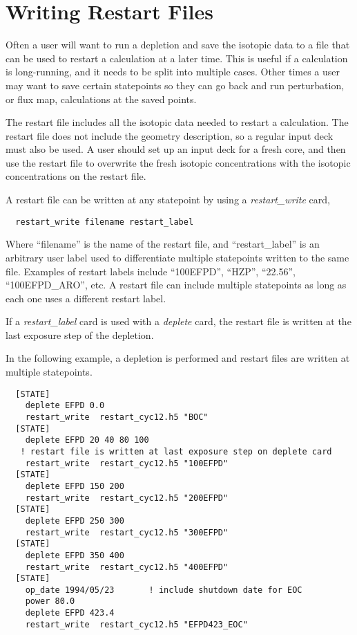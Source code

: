 \section{Writing Restart Files}

Often a user will want to run a depletion and save the isotopic data to a file that can be used to 
restart a calculation at a later time.  This is useful if a calculation is long-running, and it needs to be
split into multiple cases.  Other times a user may want to save certain statepoints so they can go
back and run perturbation, or flux map, calculations at the saved points.

The restart file includes all the isotopic data needed to restart a calculation.
The restart file does not include the geometry description, so a regular input deck must also be used.
A user should set up an input deck for a fresh core, and then use the restart file to 
overwrite the fresh isotopic concentrations with the isotopic concentrations on the restart file.

A restart file can be written at any statepoint by using a {\it restart\_write} card,
\begin{verbatim}
  restart_write filename restart_label
\end{verbatim}
Where ``filename'' is the name of the restart file, and ``restart\_label'' is an arbitrary user label used
to differentiate multiple statepoints written to the same file.  Examples of restart labels
include ``100EFPD'', ``HZP'', ``22.56'', ``100EFPD\_ARO'', etc.
A restart file can include multiple statepoints as long as each one uses a different restart label.

If a {\it restart\_label} card is used with a {\it deplete} card, the restart file is written at the last
exposure step of the depletion.

In the following example, a depletion is performed and restart files are written at multiple statepoints.
\begin{verbatim}
  [STATE]
    deplete EFPD 0.0
    restart_write  restart_cyc12.h5 "BOC"
  [STATE]
    deplete EFPD 20 40 80 100
   ! restart file is written at last exposure step on deplete card
    restart_write  restart_cyc12.h5 "100EFPD"
  [STATE]
    deplete EFPD 150 200
    restart_write  restart_cyc12.h5 "200EFPD"
  [STATE]
    deplete EFPD 250 300
    restart_write  restart_cyc12.h5 "300EFPD"
  [STATE]
    deplete EFPD 350 400
    restart_write  restart_cyc12.h5 "400EFPD"
  [STATE]
    op_date 1994/05/23       ! include shutdown date for EOC
    power 80.0
    deplete EFPD 423.4
    restart_write  restart_cyc12.h5 "EFPD423_EOC"
\end{verbatim}

